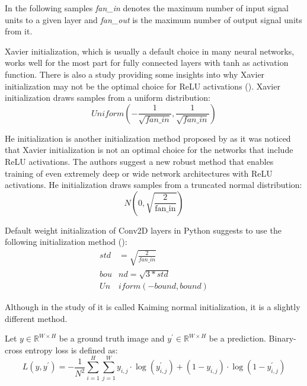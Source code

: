 In the following samples \textit{fan\_in} denotes the maximum number of input signal units to a given layer and \textit{fan\_out} is the maximum number of output signal units from it.

\begin{definition}
	Xavier initialization, which is usually a default choice in many neural networks, works well for the most part for fully connected layers with tanh as activation function. There is also a study providing some insights into why Xavier initialization may not be the optimal choice for ReLU activations (\cite{Kumar_2017}). Xavier initialization draws samples from a uniform distribution:
	\begin{equation}
		Uniform \left(-\frac{1}{\sqrt{fan\_in}}, \frac{1}{\sqrt{fan\_in}}\right)
	\end{equation}
\end{definition}

\begin{definition}[He initialization]
	He initialization is another initialization method proposed by \cite{He_2015} as it was noticed that Xavier initialization is not an optimal choice for the networks that include ReLU activations. The authors suggest a new robust method that enables training of even extremely deep or wide network architectures with ReLU activations. He initialization draws samples from a truncated normal distribution:
	\begin{equation}
		N(0, \sqrt{\frac{2}{\text{fan\_in}}})
	\end{equation}
\end{definition}

Default weight initialization of Conv2D layers in Python suggests to use the following initialization method (\cite{He_2015}):
\begin{align}
	std &= \sqrt{\frac{2}{fan\_in}} \\
	bou&nd = \sqrt{3 * std} \\
	Un&iform\left(-bound, bound\right)
\end{align}

Although in the study of \cite{He_2015} it is called Kaiming normal initialization, it is a slightly different method.

\begin{definition}
	Let $y \in \mathbb{R}^{W \times H}$ be a ground truth image and $y^\prime \in \mathbb{R}^{W \times H}$ be a prediction. Binary-cross entropy loss is defined as:
	\begin{equation}
		L(y, y^\prime) = - \frac{1}{N^2}\sum_{i=1}^{H} \sum_{j=1}^{W} y_{i,j} \cdot \log(y_{i, j}^\prime) +  (1 - y_{i, j}) \cdot \log(1 - y_{i, j}^\prime) 
	\end{equation}
\end{definition}

